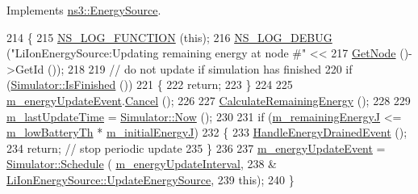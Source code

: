 Implements \hyperlink{classns3_1_1EnergySource_a528aca240cc8d85076982c5042a85e66}{ns3\+::\+Energy\+Source}.


\begin{DoxyCode}
214 \{
215   \hyperlink{log-macros-disabled_8h_a90b90d5bad1f39cb1b64923ea94c0761}{NS\_LOG\_FUNCTION} (\textcolor{keyword}{this});
216   \hyperlink{group__logging_ga413f1886406d49f59a6a0a89b77b4d0a}{NS\_LOG\_DEBUG} (\textcolor{stringliteral}{"LiIonEnergySource:Updating remaining energy at node #"} <<
217                 \hyperlink{classns3_1_1EnergySource_acac258882d8c38efa49d1f6053eb97ae}{GetNode} ()->GetId ());
218 
219   \textcolor{comment}{// do not update if simulation has finished}
220   \textcolor{keywordflow}{if} (\hyperlink{classns3_1_1Simulator_aa8c662d04480705d09b3d65b4dea9d2f}{Simulator::IsFinished} ())
221     \{
222       \textcolor{keywordflow}{return};
223     \}
224 
225   \hyperlink{classns3_1_1LiIonEnergySource_aa5c7c2460f252aa02e2473335bb582c1}{m\_energyUpdateEvent}.\hyperlink{classns3_1_1EventId_a993ae94e48e014e1afd47edb16db7a11}{Cancel} ();
226 
227   \hyperlink{classns3_1_1LiIonEnergySource_a7df49ec678488cab1e5d57a2ee7e3ddb}{CalculateRemainingEnergy} ();
228 
229   \hyperlink{classns3_1_1LiIonEnergySource_aff305a21b56ec669a64b5e0fa5d8d268}{m\_lastUpdateTime} = \hyperlink{classns3_1_1Simulator_ac3178fa975b419f7875e7105be122800}{Simulator::Now} ();
230 
231   \textcolor{keywordflow}{if} (\hyperlink{classns3_1_1LiIonEnergySource_a550b7c1858cc4a397290c5696eff4e3e}{m\_remainingEnergyJ} <= \hyperlink{classns3_1_1LiIonEnergySource_a972d6f81d00be4fab50e1cb4fe057260}{m\_lowBatteryTh} * 
      \hyperlink{classns3_1_1LiIonEnergySource_a576f4ff41033407b325d7b9274c8f646}{m\_initialEnergyJ})
232     \{
233       \hyperlink{classns3_1_1LiIonEnergySource_a9877b583fe62f4f4787e465b28cda8c8}{HandleEnergyDrainedEvent} ();
234       \textcolor{keywordflow}{return}; \textcolor{comment}{// stop periodic update}
235     \}
236 
237   \hyperlink{classns3_1_1LiIonEnergySource_aa5c7c2460f252aa02e2473335bb582c1}{m\_energyUpdateEvent} = \hyperlink{classns3_1_1Simulator_a671882c894a08af4a5e91181bf1eec13}{Simulator::Schedule} (
      \hyperlink{classns3_1_1LiIonEnergySource_a7fbf4eff8a6ddf3731af34ed9f10a478}{m\_energyUpdateInterval},
238                                              &
      \hyperlink{classns3_1_1LiIonEnergySource_a189ac70234f5af2d1b1457ea43bd1b9f}{LiIonEnergySource::UpdateEnergySource},
239                                              \textcolor{keyword}{this});
240 \}
\end{DoxyCode}


